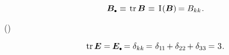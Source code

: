 \nopagebreak\en{\vspace{-0.25em}}\ru{\vspace{-0.8em}}\begin{equation*}
\bm{B}\tracedot \hspace{.25ex} \equiv \hspace{.3ex}
\operatorname{tr} \bm{B} \hspace{.15ex} \equiv \hspace{.4ex}
\mathrm{I}\hspace{.16ex}(\bm{B}) \hspace{-0.15ex}
= B_{kk}
\hspace{.1ex} .
\end{equation*}

\vspace{-0.16em}   ()  

\nopagebreak\vspace{-0.2em}\begin{equation*}
\operatorname{tr} \bm{E} = \hspace{-0.1ex} \bm{E}\tracedot = \delta_{kk} \hspace{-0.2ex} = \hspace{.1ex} \delta_{1\hspace{-0.12ex}1} \hspace{-0.2ex} + \delta_{22} \hspace{-0.2ex} + \delta_{33} \hspace{-0.1ex} = \hspace{.1ex} 3
\hspace{.1ex} .
\end{equation*}

